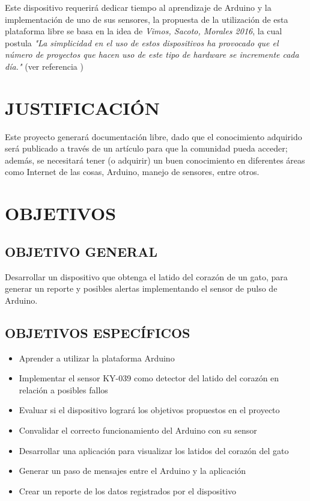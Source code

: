 \documentclass[letterpaper, 10 pt, conference]{ieeeconf}  %
\begin{document}
Este dispositivo requerir\'a dedicar tiempo al aprendizaje de Arduino y la implementaci\'on de uno de sus sensores, la propuesta de la utilizaci\'on de esta plataforma libre se basa en la idea de \textit{Vimos, Sacoto, Morales 2016}, la cual postula \textit{"La simplicidad en el uso de estos dispositivos ha provocado que el n\'umero de proyectos que hacen uso de este tipo de hardware se incremente cada d\'ia."} (ver referencia \cite{c1})

\section{JUSTIFICACI\'ON}

Este proyecto generar\'a documentaci\'on libre, dado que el conocimiento adquirido ser\'a publicado a trav\'es de un art\'iculo para que la comunidad pueda acceder; adem\'as, se necesitar\'a tener (o adquirir) un buen conocimiento en diferentes \'areas como Internet de las cosas, Arduino, manejo de sensores, entre otros.

\section{OBJETIVOS}

\subsection{OBJETIVO GENERAL}

Desarrollar un dispositivo que obtenga el latido del coraz\'on de un gato, para generar un reporte y posibles alertas implementando el sensor de pulso de Arduino.

\subsection{OBJETIVOS ESPEC\'IFICOS}

\begin{itemize}
    \item Aprender a utilizar la plataforma Arduino
    \item Implementar el sensor KY-039 como detector del latido del coraz\'on en relaci\'on a posibles fallos
    \item Evaluar si el dispositivo lograr\'a los objetivos propuestos en el proyecto
    \item Convalidar el correcto funcionamiento del Arduino con su sensor
    \item Desarrollar una aplicaci\'on para visualizar los latidos del coraz\'on del gato
    \item Generar un paso de mensajes entre el Arduino y la aplicaci\'on 
    \item Crear un reporte de los datos registrados por el dispositivo
\end{itemize}
\end{document}
